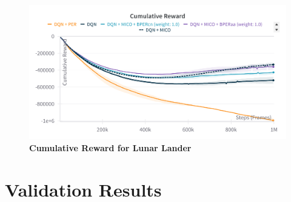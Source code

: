 \begin{figure}[H]
    \centering
    \includegraphics[width=1.\linewidth]{Results/general_results/cumulative_reward_lunar_lander.png}
    \caption[Cumulative Reward for Lunar Lander]{\textbf{Cumulative Reward for Lunar Lander}}
    \label{fig:cumulative_reward_lunar_lander}
\end{figure}

\section{Validation Results}


